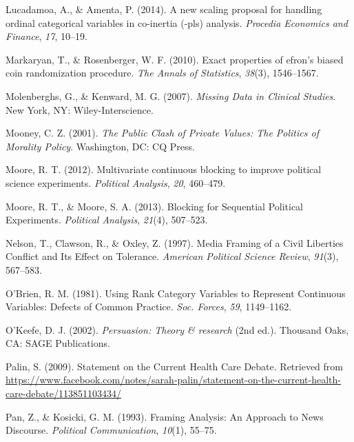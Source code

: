 \documentclass[12pt,econ]{sources/authesis}
\begin{document}
\leavevmode\hypertarget{ref-lucadamoa_2014_scaling}{}%
Lucadamoa, A., \& Amenta, P. (2014). A new scaling proposal for handling ordinal categorical variables in co-inertia (-pls) analysis. \emph{Procedia Economics and Finance}, \emph{17}, 10--19.

\leavevmode\hypertarget{ref-markaryan_2010_exact}{}%
Markaryan, T., \& Rosenberger, W. F. (2010). Exact properties of efron's biased coin randomization procedure. \emph{The Annals of Statistics}, \emph{38}(3), 1546--1567.

\leavevmode\hypertarget{ref-molenberghs_2007_missing}{}%
Molenberghs, G., \& Kenward, M. G. (2007). \emph{Missing Data in Clinical Studies}. New York, NY: Wiley-Interscience.

\leavevmode\hypertarget{ref-mooney_public_2001}{}%
Mooney, C. Z. (2001). \emph{The Public Clash of Private Values: The Politics of Morality Policy}. Washington, DC: CQ Press.

\leavevmode\hypertarget{ref-moore_2012_multivariate}{}%
Moore, R. T. (2012). Multivariate continuous blocking to improve political science experiments. \emph{Political Analysis}, \emph{20}, 460--479.

\leavevmode\hypertarget{ref-moore_blocking_2013}{}%
Moore, R. T., \& Moore, S. A. (2013). Blocking for Sequential Political Experiments. \emph{Political Analysis}, \emph{21}(4), 507--523.

\leavevmode\hypertarget{ref-nelson_media_1997}{}%
Nelson, T., Clawson, R., \& Oxley, Z. (1997). Media Framing of a Civil Liberties Conflict and Its Effect on Tolerance. \emph{American Political Science Review}, \emph{91}(3), 567--583.

\leavevmode\hypertarget{ref-obrien_1981_using}{}%
O'Brien, R. M. (1981). Using Rank Category Variables to Represent Continuous Variables: Defects of Common Practice. \emph{Soc. Forces}, \emph{59}, 1149--1162.

\leavevmode\hypertarget{ref-okeefe_2002_persuasion}{}%
O'Keefe, D. J. (2002). \emph{Persuasion: Theory \& research} (2nd ed.). Thousand Oaks, CA: SAGE Publications.

\leavevmode\hypertarget{ref-palin_statement_2009}{}%
Palin, S. (2009). Statement on the Current Health Care Debate. Retrieved from \url{https://www.facebook.com/notes/sarah-palin/statement-on-the-current-health-care-debate/113851103434/}

\leavevmode\hypertarget{ref-pan_framing_1993}{}%
Pan, Z., \& Kosicki, G. M. (1993). Framing Analysis: An Approach to News Discourse. \emph{Political Communication}, \emph{10}(1), 55--75.
\end{document}
